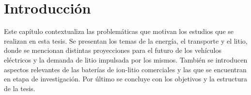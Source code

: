 \chapter{Introducción}\label{ch:introduccion}
\thispagestyle{empty}

\vspace{50pt}

\begin{adjustwidth}{50pt}{50pt}
    Este capítulo contextualiza las problemáticas que motivan los estudios
    que se realizan en esta tesis. Se presentan los temas de la energía, el 
    transporte y el litio, donde se mencionan distintas proyecciones para el 
    futuro de los vehículos eléctricos y la demanda de litio impulsada por 
    los mismos. También se introducen aspectos relevantes de las baterías de
    ion-litio comerciales y las que se encuentran en etapa de investigación.
    Por último se concluye con los objetivos y la estructura de la tesis.
\end{adjustwidth}

\clearpage
\newpage
\thispagestyle{empty}
\mbox{}
\newpage








